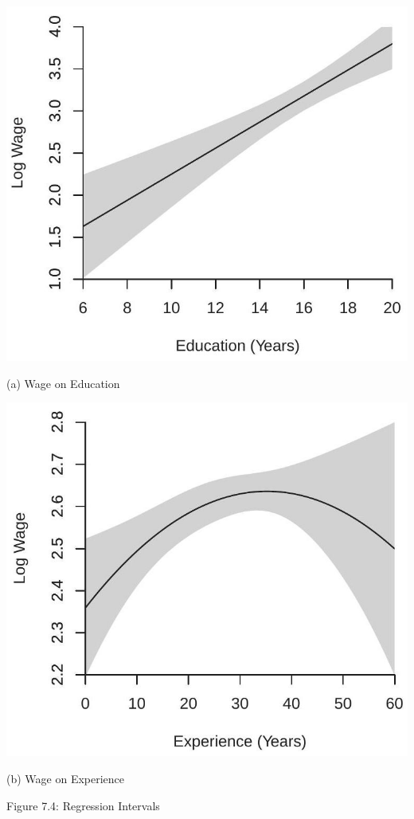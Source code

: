 \documentclass[10pt]{article}
\begin{document}
\includegraphics[max width=\textwidth]{2022_09_17_4fdd33cd9a12f3020189g-22}

(a) Wage on Education

\includegraphics[max width=\textwidth]{2022_09_17_4fdd33cd9a12f3020189g-22(1)}

(b) Wage on Experience

Figure 7.4: Regression Intervals
\end{document}
